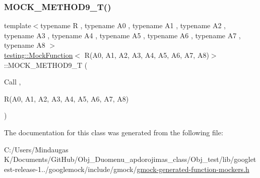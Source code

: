 \mbox{\label{classtesting_1_1_mock_function_3_01_r_07_a0_00_01_a1_00_01_a2_00_01_a3_00_01_a4_00_01_a5_00_01_a6_00_01_a7_00_01_a8_08_4_a0fee6ada67063cc8ec8b2181021f0195}} 
\subsubsection{\texorpdfstring{MOCK\_METHOD9\_T()}{MOCK\_METHOD9\_T()}}
{\footnotesize\ttfamily template$<$typename R , typename A0 , typename A1 , typename A2 , typename A3 , typename A4 , typename A5 , typename A6 , typename A7 , typename A8 $>$ \\
\mbox{\hyperlink{classtesting_1_1_mock_function}{testing\+::\+Mock\+Function}}$<$ R(A0, A1, A2, A3, A4, A5, A6, A7, A8)$>$\+::M\+O\+C\+K\+\_\+\+M\+E\+T\+H\+O\+D9\+\_\+T (\begin{DoxyParamCaption}\item[{Call}]{,  }\item[{R(A0, A1, A2, A3, A4, A5, A6, A7, A8)}]{ }\end{DoxyParamCaption})}



The documentation for this class was generated from the following file\+:\begin{DoxyCompactItemize}
\item 
C\+:/\+Users/\+Mindaugas K/\+Documents/\+Git\+Hub/\+Obj\+\_\+\+Duomenu\+\_\+apdorojimas\+\_\+class/\+Obj\+\_\+test/lib/googletest-\/release-\/1../googlemock/include/gmock/\mbox{\hyperlink{_obj__test_2lib_2googletest-release-1_88_81_2googlemock_2include_2gmock_2gmock-generated-function-mockers_8h}{gmock-\/generated-\/function-\/mockers.\+h}}\end{DoxyCompactItemize}
